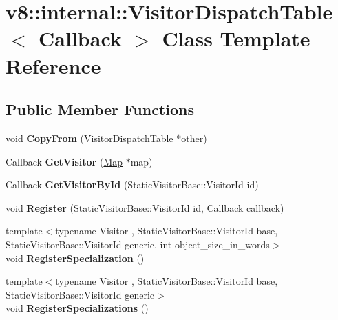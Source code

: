 \hypertarget{classv8_1_1internal_1_1_visitor_dispatch_table}{}\section{v8\+:\+:internal\+:\+:Visitor\+Dispatch\+Table$<$ Callback $>$ Class Template Reference}
\label{classv8_1_1internal_1_1_visitor_dispatch_table}
\subsection*{Public Member Functions}
\begin{DoxyCompactItemize}
\item 
void {\bfseries Copy\+From} (\hyperlink{classv8_1_1internal_1_1_visitor_dispatch_table}{Visitor\+Dispatch\+Table} $\ast$other)\hypertarget{classv8_1_1internal_1_1_visitor_dispatch_table_aee76ccdb2cac00f9a461262e952d13e9}{}\label{classv8_1_1internal_1_1_visitor_dispatch_table_aee76ccdb2cac00f9a461262e952d13e9}

\item 
Callback {\bfseries Get\+Visitor} (\hyperlink{classv8_1_1internal_1_1_map}{Map} $\ast$map)\hypertarget{classv8_1_1internal_1_1_visitor_dispatch_table_a34ddc529f94034a8614b0123ec3f0e6d}{}\label{classv8_1_1internal_1_1_visitor_dispatch_table_a34ddc529f94034a8614b0123ec3f0e6d}

\item 
Callback {\bfseries Get\+Visitor\+By\+Id} (Static\+Visitor\+Base\+::\+Visitor\+Id id)\hypertarget{classv8_1_1internal_1_1_visitor_dispatch_table_a7cd22eace7b336cb8a36b975c0040561}{}\label{classv8_1_1internal_1_1_visitor_dispatch_table_a7cd22eace7b336cb8a36b975c0040561}

\item 
void {\bfseries Register} (Static\+Visitor\+Base\+::\+Visitor\+Id id, Callback callback)\hypertarget{classv8_1_1internal_1_1_visitor_dispatch_table_aa9bb2444ecf89e723c869e20a40193db}{}\label{classv8_1_1internal_1_1_visitor_dispatch_table_aa9bb2444ecf89e723c869e20a40193db}

\item 
{\footnotesize template$<$typename Visitor , Static\+Visitor\+Base\+::\+Visitor\+Id base, Static\+Visitor\+Base\+::\+Visitor\+Id generic, int object\+\_\+size\+\_\+in\+\_\+words$>$ }\\void {\bfseries Register\+Specialization} ()\hypertarget{classv8_1_1internal_1_1_visitor_dispatch_table_a7ed2433cc7d6182ad243b4c71db77f40}{}\label{classv8_1_1internal_1_1_visitor_dispatch_table_a7ed2433cc7d6182ad243b4c71db77f40}

\item 
{\footnotesize template$<$typename Visitor , Static\+Visitor\+Base\+::\+Visitor\+Id base, Static\+Visitor\+Base\+::\+Visitor\+Id generic$>$ }\\void {\bfseries Register\+Specializations} ()\hypertarget{classv8_1_1internal_1_1_visitor_dispatch_table_af15452f81ecf9f7161e80698e1677ded}{}\label{classv8_1_1internal_1_1_visitor_dispatch_table_af15452f81ecf9f7161e80698e1677ded}

\end{DoxyCompactItemize}
